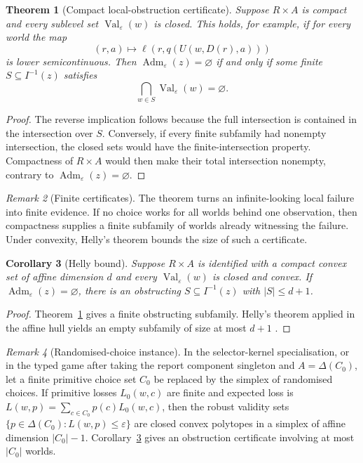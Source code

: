 \documentclass[11pt]{article}
\theoremstyle{plain}
\newtheorem{theorem}{Theorem}[section]
\newtheorem{corollary}[theorem]{Corollary}
\theoremstyle{definition}
\theoremstyle{remark}
\newtheorem{remark}[theorem]{Remark}
\newcommand{\Adm}{\operatorname{Adm}}
\newcommand{\eps}{\varepsilon}
\begin{document}
\begin{theorem}[Compact local-obstruction certificate]\label{thm:compact-obstruction}
Suppose $R\times A$ is compact and every sublevel set
$\operatorname{Val}_\eps(w)$ is closed. This holds, for example, if for every
world the map
\[
(r,a)\longmapsto\ell(r,q(U(w,D(r),a)))
\]
is lower semicontinuous. Then $\Adm_\eps(z)=\varnothing$ if and only if some finite
$S\subseteq I^{-1}(z)$ satisfies
\[
\bigcap_{w\in S}\operatorname{Val}_\eps(w)=\varnothing.
\]
\end{theorem}

\begin{proof}
The reverse implication follows because the full intersection is contained in the
intersection over $S$. Conversely, if
every finite subfamily had nonempty
intersection, the closed sets would have the finite-intersection property.
Compactness of $R\times A$ would then make their total intersection nonempty,
contrary to $\Adm_\eps(z)=\varnothing$.
\end{proof}

\begin{remark}[Finite certificates]
The theorem turns an infinite-looking local failure into finite evidence. If no
choice works for all worlds behind one observation, then compactness supplies a
finite subfamily of worlds already witnessing the failure. Under convexity,
Helly's theorem bounds the size of such a certificate.
\end{remark}

\begin{corollary}[Helly bound]\label{cor:helly}
Suppose $R\times A$ is identified with a compact convex set of affine dimension
$d$ and every $\operatorname{Val}_\eps(w)$ is closed and convex. If
$\Adm_\eps(z)=\varnothing$, there is an obstructing
$S\subseteq I^{-1}(z)$ with $|S|\le d+1$.
\end{corollary}

\begin{proof}
Theorem~\ref{thm:compact-obstruction} gives a finite obstructing subfamily.
Helly's theorem applied in the affine hull yields an empty subfamily of size at
most $d+1$ \cite{eckhoff}.
\end{proof}

\begin{remark}[Randomised-choice instance]
In the selector-kernel specialisation, or in the typed game after taking the
report component singleton and $A=\Delta(C_0)$, let a finite primitive choice
set $C_0$ be replaced by the simplex of randomised choices. If primitive losses
$L_0(w,c)$ are finite and expected loss is
$L(w,p)=\sum_{c\in C_0}p(c)L_0(w,c)$, then the robust validity sets
$\{p\in\Delta(C_0):L(w,p)\le\eps\}$ are closed convex polytopes in a
simplex of affine dimension $|C_0|-1$. Corollary~\ref{cor:helly} gives an
obstruction certificate involving at most $|C_0|$ worlds.
\end{remark}
\end{document}
